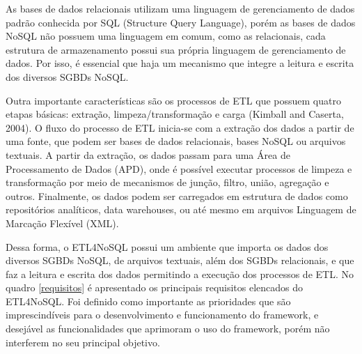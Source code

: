 As bases de dados relacionais utilizam uma linguagem de gerenciamento de dados padrão conhecida por SQL (Structure Query Language), porém as bases de dados NoSQL não possuem uma linguagem em comum, como as relacionais, cada estrutura de armazenamento possui sua própria linguagem de gerenciamento de dados. Por isso, é essencial que haja um mecanismo que integre a leitura e escrita dos diversos SGBDs NoSQL. 

Outra importante características são os processos de ETL que possuem quatro etapas básicas: extração, limpeza/transformação e carga (Kimball and Caserta, 2004). O fluxo do processo de ETL inicia-se com a extração dos dados a partir de uma fonte, que podem ser bases de dados relacionais, bases NoSQL ou arquivos textuais. A partir da extração, os dados passam para uma Área de Processamento de Dados (APD), onde é possível executar processos de limpeza e transformação por meio de mecanismos de junção, filtro, união, agregação e outros. Finalmente, os dados podem ser carregados em estrutura de dados como repositórios analíticos, data warehouses, ou até mesmo em arquivos Linguagem de Marcação Flexível (XML).

Dessa forma, o ETL4NoSQL possui um ambiente que importa os dados dos diversos SGBDs NoSQL, de arquivos textuais, além dos SGBDs relacionais, e que faz a leitura e escrita dos dados permitindo a execução dos processos de ETL. No quadro \ref{requisitos} é apresentado os principais requisitos elencados do ETL4NoSQL. Foi definido como importante as prioridades que são imprescindíveis para o desenvolvimento e funcionamento do framework, e desejável as funcionalidades que aprimoram o uso do framework, porém não interferem no seu principal objetivo.

